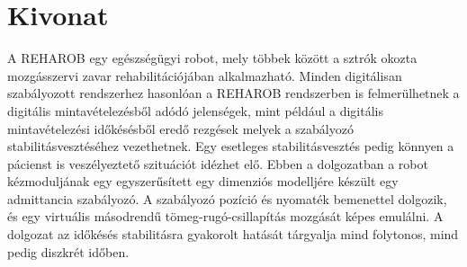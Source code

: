 \cleardoublepage{}
\chapter*{Kivonat}

A REHAROB egy egészségügyi robot, mely többek között a sztrók okozta mozgásszervi 
zavar rehabilitációjában alkalmazható. 
%
Minden digitálisan szabályozott rendszerhez hasonlóan a REHAROB rendszerben is felmerülhetnek a 
digitális mintavételezésből adódó jelenségek, mint például a digitális mintavételezési időkésésből 
eredő rezgések melyek a szabályozó stabilitásvesztéséhez vezethetnek. 
%
Egy esetleges stabilitásvesztés pedig könnyen a pácienst is veszélyeztető szituációt idézhet elő.%
%
Ebben a dolgozatban a robot kézmoduljának egy egyszerűsített egy dimenziós modelljére készült egy 
admittancia szabályozó. 
%
A szabályozó pozíció és nyomaték bemenettel 
dolgozik, és egy virtuális másodrendű tömeg-rugó-csillapítás mozgását képes emulálni. 
%
A dolgozat az időkésés stabilitásra gyakorolt hatását tárgyalja mind
folytonos, mind pedig diszkrét időben. 